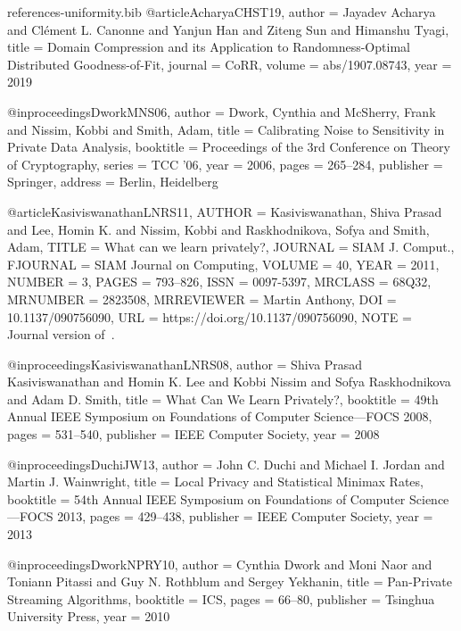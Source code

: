 \documentclass[10pt]{article}
\begin{document}
\begin{filecontents}{references-uniformity.bib}
@article{AcharyaCHST19,
  author    = {Jayadev Acharya and
               Cl{\'{e}}ment L. Canonne and
               Yanjun Han and
               Ziteng Sun and
               Himanshu Tyagi},
  title     = {Domain Compression and its Application to Randomness-Optimal Distributed
               Goodness-of-Fit},
  journal   = {CoRR},
  volume    = {abs/1907.08743},
  year      = {2019}
}

@inproceedings{DworkMNS06,
  author        = {Dwork, Cynthia and McSherry, Frank and Nissim, Kobbi and Smith, Adam},
  title         = {Calibrating Noise to Sensitivity in Private Data Analysis},
  booktitle     = {Proceedings of the 3rd Conference on Theory of Cryptography},
  series        = {TCC '06},
  year          = {2006},
  pages         = {265--284},
  publisher     = {Springer},
  address       = {Berlin, Heidelberg}
}


@article{KasiviswanathanLNRS11,
    AUTHOR = {Kasiviswanathan, Shiva Prasad and Lee, Homin K. and Nissim,
              Kobbi and Raskhodnikova, Sofya and Smith, Adam},
     TITLE = {What can we learn privately?},
   JOURNAL = {SIAM J. Comput.},
  FJOURNAL = {SIAM Journal on Computing},
    VOLUME = {40},
      YEAR = {2011},
    NUMBER = {3},
     PAGES = {793--826},
      ISSN = {0097-5397},
   MRCLASS = {68Q32},
  MRNUMBER = {2823508},
MRREVIEWER = {Martin Anthony},
       DOI = {10.1137/090756090},
       URL = {https://doi.org/10.1137/090756090},
      NOTE = {Journal version of~\cite{KasiviswanathanLNRS08}.}
}

@inproceedings{KasiviswanathanLNRS08,
  author    = {Shiva Prasad Kasiviswanathan and
               Homin K. Lee and
               Kobbi Nissim and
               Sofya Raskhodnikova and
               Adam D. Smith},
  title     = {What Can We Learn Privately?},
  booktitle = {49th Annual IEEE Symposium on Foundations of Computer Science---{FOCS} 2008}, 
  pages     = {531--540},
  publisher = {{IEEE} Computer Society},
  year      = {2008}
}

@inproceedings{DuchiJW13,
  author    = {John C. Duchi and
               Michael I. Jordan and
               Martin J. Wainwright},
  title     = {Local Privacy and Statistical Minimax Rates},
  booktitle = {54th Annual IEEE Symposium on Foundations of Computer Science---{FOCS} 2013}, 
  pages     = {429--438},
  publisher = {{IEEE} Computer Society},
  year      = {2013}
}

@inproceedings{DworkNPRY10,
  author    = {Cynthia Dwork and
               Moni Naor and
               Toniann Pitassi and
               Guy N. Rothblum and
               Sergey Yekhanin},
  title     = {Pan-Private Streaming Algorithms},
  booktitle = {{ICS}},
  pages     = {66--80},
  publisher = {Tsinghua University Press},
  year      = {2010}
}


\end{filecontents}
\end{document}
